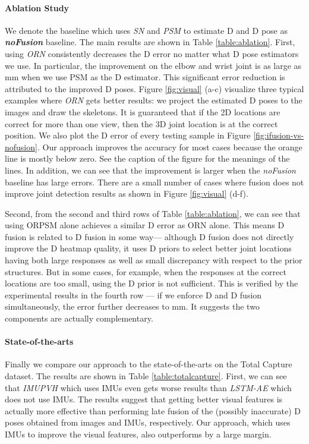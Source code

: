\documentclass[10pt,twocolumn,letterpaper]{article}
\begin{document}
\paragraph{Ablation Study}
We denote the baseline which uses \emph{SN} and \emph{PSM} to estimate D and D pose as \textbf{\emph{noFusion}} baseline. The main results are shown in Table \ref{table:ablation}. 
First, using \emph{ORN} consistently decreases the D error no matter what D pose estimators we use. In particular, the improvement on the elbow and wrist joint is as large as mm when we use PSM as the D estimator. This significant error reduction is attributed to the improved D poses. 
Figure \ref{fig:visual} (a-c) visualize three typical examples where \emph{ORN} gets better results: we project the estimated D poses to the images and draw the skeletons. It is guaranteed that if the 2D locations are correct for more than one view, then the 3D joint location is at the correct position. We also plot the D error of every testing sample in Figure \ref{fig:ifusion-vs-nofusion}. Our approach improves the accuracy for most cases because the orange line is mostly below zero. See the caption of the figure for the meanings of the lines. In addition, we can see that the improvement is larger when the \emph{noFusion} baseline has large errors. There are a small number of cases where fusion does not improve joint detection results as shown in Figure \ref{fig:visual} (d-f).

Second, from the second and third rows of Table \ref{table:ablation}, we can see that using ORPSM alone achieves a similar D error as ORN alone. This means D fusion is related to D fusion in some way--- although D fusion does not directly improve the D heatmap quality, it uses D priors to select better joint locations having both large responses as well as small discrepancy with respect to the prior structures. But in some cases, for example, when the responses at the correct locations are too small, using the D prior is not sufficient. This is verified by the experimental results in the fourth row --- if we enforce D and D fusion simultaneously, the error further decreases to mm. It suggests the two components are actually complementary.



\paragraph{State-of-the-arts } Finally we compare our approach to the state-of-the-arts on the Total Capture dataset. The results are shown in Table \ref{table:totalcapture}. First, we can see that \emph{IMUPVH} \cite{gilbert2019fusing} which uses IMUs even gets worse results than \emph{LSTM-AE} \cite{trumble2018deep} which does not use IMUs. The results suggest that getting better visual features is actually more effective than performing late fusion of the (possibly inaccurate) D poses obtained from images and IMUs, respectively. Our approach, which uses IMUs to improve the visual features, also outperforms \cite{gilbert2019fusing} by a large margin.
\end{document}
